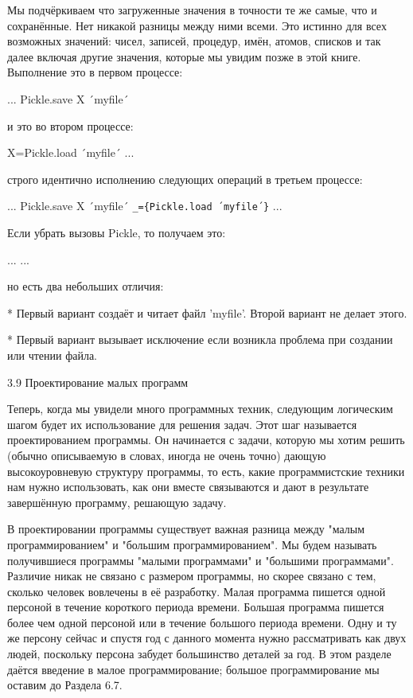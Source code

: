 Мы подчёркиваем что загруженные значения в точности те же самые, что и сохранённые. Нет никакой разницы между ними всеми. Это истинно для всех возможных значений: чисел, записей, процедур, имён, атомов, списков и так далее включая другие значения, которые мы увидим позже в этой книге. Выполнение это в первом процессе:

... %
{Pickle.save X ´myfile´}


и это во втором процессе:

X={Pickle.load ´myfile´}
... %


строго идентично исполнению следующих операций в третьем процессе:

... %
{Pickle.save X ´myfile´}
\verb!_={Pickle.load ´myfile´}!
... %


Если убрать вызовы Pickle, то получаем это:

... %
... %


но есть два небольших отличия:

* Первый вариант создаёт и читает файл 'myfile'. Второй вариант не делает этого.

* Первый вариант вызывает исключение если возникла проблема при создании или чтении файла.

3.9 Проектирование малых программ

Теперь, когда мы увидели много программных техник, следующим логическим шагом будет их использование для решения задач. Этот шаг называется проектированием программы. Он начинается с задачи, которую мы хотим решить (обычно описываемую в словах, иногда не очень точно) дающую высокоуровневую структуру программы, то есть, какие программистские техники нам нужно использовать, как они вместе связываются и дают в результате завершённую программу, решающую задачу.

В проектировании программы существует важная разница между "малым программированием" и "большим программированием". Мы будем называть получившиеся программы "малыми программами" и "большими программами". Различие никак не связано с размером программы, но скорее связано с тем, сколько человек вовлечены в её разработку. Малая программа пишется одной персоной в течение короткого периода времени. Большая программа пишется более чем одной персоной или в течение большого периода времени. Одну и ту же персону сейчас и спустя год с данного момента нужно рассматривать как двух людей, поскольку персона забудет большинство деталей за год. В этом разделе даётся введение в малое программирование; большое программирование мы оставим до Раздела 6.7.

